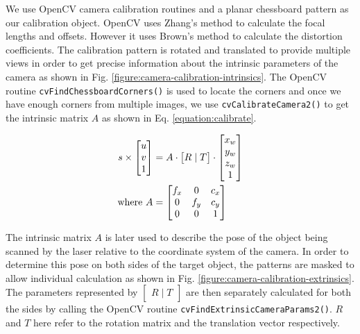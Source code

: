 We use OpenCV camera calibration routines and a planar chessboard pattern as
our calibration object. OpenCV uses Zhang's method \cite{zhang:2000} to
calculate the focal lengths and offsets. However it uses Brown's method
\cite{brown:1971} to calculate the distortion coefficients. The calibration
pattern is rotated and translated to provide multiple views in order to get
precise information about the intrinsic parameters of the camera as shown in
Fig.  \ref{figure:camera-calibration-intrinsics}.  The OpenCV routine
\texttt{cvFindChessboardCorners()} is used to locate the corners and once we
have enough corners from multiple images, we use \texttt{cvCalibrateCamera2()}
to get the intrinsic matrix $A$ as shown in Eq. \ref{equation:calibrate}.

\begin{align}
	\label{equation:calibrate}
	s \times
	\begin{bmatrix}
		u \\ v \\	1 \\
	\end{bmatrix} &= A \cdot \begin{bmatrix}
															R \mid T
	 				  								\end{bmatrix}
										 \cdot \begin{bmatrix}
															x_w \\ y_w \\ z_w \\ 1
														\end{bmatrix} \\
	\text{where}~
	A &= \begin{bmatrix}
					f_x & 0 & c_x \\
					0 & f_y & c_y \\
					0 & 0 & 1 \\
 		 	 \end{bmatrix} \notag
\end{align}

The intrinsic matrix $A$ is later used to describe the pose of the object
being scanned by the laser relative to the coordinate system of the camera. In
order to determine this pose on both sides of the target object, the patterns
are masked to allow individual calculation as shown in Fig.
\ref{figure:camera-calibration-extrinsics}. The parameters represented by
$\begin{bmatrix}R \mid T\end{bmatrix}$ are then separately calculated for both
the sides by calling the OpenCV routine
\texttt{cvFindExtrinsicCameraParams2()}. $R$ and $T$ here refer to the rotation
matrix and the translation vector respectively.

